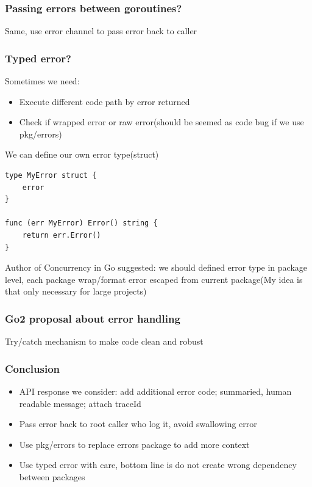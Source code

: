 \documentclass[9pt]{beamer}
\begin{document}
\begin{frame}[fragile]
\frametitle{Passing errors between goroutines?}


Same, use error channel to pass error back to caller



\end{frame}

\begin{frame}[fragile]
\frametitle{Typed error?}


Sometimes we need: 


\begin{itemize}
\item Execute different code path by error returned
\item Check if wrapped error or raw error(should be seemed as code bug if we use pkg/errors)
\end{itemize}

We can define our own error type(struct)


\begin{verbatim}
type MyError struct {
	error
}

func (err MyError) Error() string {
	return err.Error()
}

\end{verbatim}

Author of Concurrency in Go suggested: we should defined error type in package level, each package wrap/format error escaped from current package(My idea is that only necessary for large projects)



\end{frame}

\begin{frame}[fragile]
\frametitle{Go2 proposal about error handling}


Try/catch mechanism to make code clean and robust



\end{frame}

\begin{frame}[fragile]
\frametitle{Conclusion}


\begin{itemize}
\item API response we consider: add additional error code; summaried, human readable message; attach traceId
\item Pass error back to root caller who log it, avoid swallowing error
\item Use pkg/errors to replace errors package to add more context
\item Use typed error with care, bottom line is do not create wrong dependency between packages
\end{itemize}


\end{frame}
\end{document}
